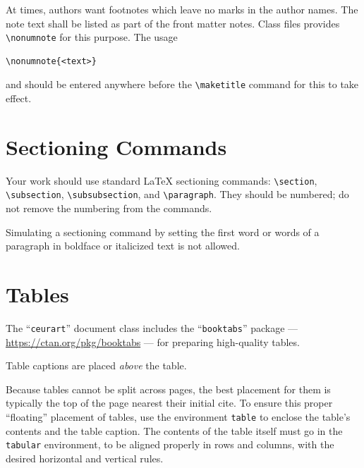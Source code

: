\documentclass[]{ceurart}
\begin{document}
At times, authors want footnotes which leave no marks in
the author names. The note text shall be listed as part of
the front matter notes. Class files provides
\verb|\nonumnote| for this purpose. The usage
\begin{verbatim}
\nonumnote{<text>}
\end{verbatim}
and should be entered anywhere before the \verb|\maketitle|
command for this to take effect. 

\section{Sectioning Commands}

Your work should use standard \LaTeX{} sectioning commands:
\verb|\section|, \verb|\subsection|,
\verb|\subsubsection|, and
\verb|\paragraph|. They should be numbered; do not remove
the numbering from the commands.

Simulating a sectioning command by setting the first word or words of
a paragraph in boldface or italicized text is not allowed.

\section{Tables}

The ``\verb|ceurart|'' document class includes the ``\verb|booktabs|''
package --- \url{https://ctan.org/pkg/booktabs} --- for preparing
high-quality tables.

Table captions are placed \textit{above} the table.

Because tables cannot be split across pages, the best placement for
them is typically the top of the page nearest their initial cite.  To
ensure this proper ``floating'' placement of tables, use the
environment \verb|table| to enclose the table's contents and the
table caption. The contents of the table itself must go in the
\verb|tabular| environment, to be aligned properly in rows and
columns, with the desired horizontal and vertical rules.
\end{document}
